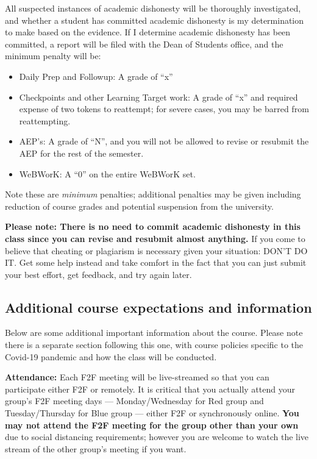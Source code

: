 \documentclass[]{article}
\providecommand{\tightlist}{%
  \setlength{\itemsep}{0pt}\setlength{\parskip}{0pt}}
\begin{document}
All suspected instances of academic dishonesty will be thoroughly
investigated, and whether a student has committed academic dishonesty is
my determination to make based on the evidence. If I determine academic
dishonesty has been committed, a report will be filed with the Dean of
Students office, and the minimum penalty will be:

\begin{itemize}
\tightlist
\item
  Daily Prep and Followup: A grade of ``x''
\item
  Checkpoints and other Learning Target work: A grade of ``x'' and
  required expense of two tokens to reattempt; for severe cases, you may
  be barred from reattempting.
\item
  AEP's: A grade of ``N'', and you will not be allowed to revise or
  resubmit the AEP for the rest of the semester.
\item
  WeBWorK: A ``0'' on the entire WeBWorK set.
\end{itemize}

Note these are \emph{minimum} penalties; additional penalties may be
given including reduction of course grades and potential suspension from
the university.

\textbf{Please note: There is no need to commit academic dishonesty in
this class since you can revise and resubmit almost anything.} If you
come to believe that cheating or plagiarism is necessary given your
situation: DON'T DO IT. Get some help instead and take comfort in the
fact that you can just submit your best effort, get feedback, and try
again later.

\hypertarget{additional-course-expectations-and-information}{%
\subsection{Additional course expectations and
information}\label{additional-course-expectations-and-information}}

Below are some additional important information about the course. Please
note there is a separate section following this one, with course
policies specific to the Covid-19 pandemic and how the class will be
conducted.

\textbf{Attendance:} Each F2F meeting will be live-streamed so that you
can participate either F2F or remotely. It is critical that you actually
attend your group's F2F meeting days --- Monday/Wednesday for Red group
and Tuesday/Thursday for Blue group --- either F2F or synchronously
online. \textbf{You may not attend the F2F meeting for the group other
than your own} due to social distancing requirements; however you are
welcome to watch the live stream of the other group's meeting if you
want.
\end{document}
